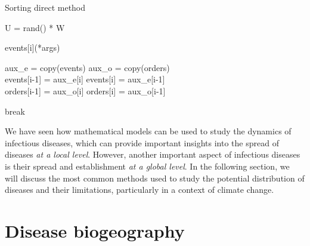 \begin{algorithm}[H]
  \caption{Sorting direct method}
  \label{alg:Chose_apply_event}
  \begin{algorithmic}[1]

    \State U = rand() * W 

     


    \State events[i](*args) \\

     

    \State aux\_e = copy(events)
    \State aux\_o = copy(orders)\\

    \State events[i-1] = aux\_e[i]
    \State events[i] = aux\_e[i-1]\\

    \State orders[i-1] = aux\_o[i]
    \State orders[i] = aux\_o[i-1]

    \EndIf

    \State break

    \EndIf

    \EndFor

  \end{algorithmic}
\end{algorithm}


We have seen how mathematical models can be used to study the dynamics of
infectious diseases, which can provide important insights into the spread of
diseases \textit{at a local level}. However, another important aspect of
infectious diseases is their spread and establishment \textit{at a global
  level}. In the following section, we will discuss the most common methods
used to study the potential distribution of diseases and their limitations,
particularly in a context of climate change.

\section{\label{sec:Disease biogeography} Disease biogeography}

